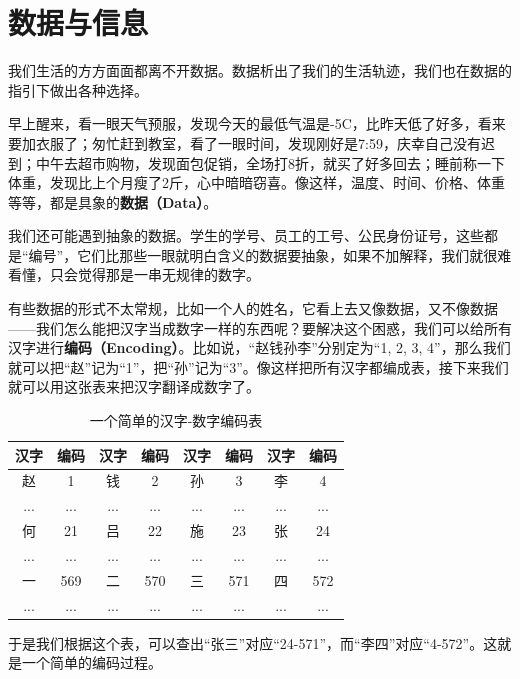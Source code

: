\section{数据与信息}
我们生活的方方面面都离不开数据。数据析出了我们的生活轨迹，我们也在数据的指引下做出各种选择。\par
早上醒来，看一眼天气预服，发现今天的最低气温是-5\textdegree C，比昨天低了好多，看来要加衣服了；匆忙赶到教室，看了一眼时间，发现刚好是7:59，庆幸自己没有迟到；中午去超市购物，发现面包促销，全场打8折，就买了好多回去；睡前称一下体重，发现比上个月瘦了2斤，心中暗暗窃喜。像这样，温度、时间、价格、体重等等，都是具象的\textbf{数据（Data）}。\par
我们还可能遇到抽象的数据。学生的学号、员工的工号、公民身份证号，这些都是“编号”，它们比那些一眼就明白含义的数据要抽象，如果不加解释，我们就很难看懂，只会觉得那是一串无规律的数字。\par
有些数据的形式不太常规，比如一个人的姓名，它看上去又像数据，又不像数据——我们怎么能把汉字当成数字一样的东西呢？要解决这个困惑，我们可以给所有汉字进行\textbf{编码（Encoding）}。比如说，``赵钱孙李''分别定为``1, 2, 3, 4''，那么我们就可以把``赵''记为``1''，把``孙''记为``3''。像这样把所有汉字都编成表，接下来我们就可以用这张表来把汉字翻译成数字了。\par
\begin{table}[htbp]
\centering
\begin{tabular}{cccccccc}
\hline
\rule{0pt}{2.4ex}
\textbf{汉字} & \textbf{编码} & \textbf{汉字} & \textbf{编码} & \textbf{汉字} & \textbf{编码} & \textbf{汉字} & \textbf{编码}\\
\hline\hline
\rule{0pt}{2.4ex}
赵 & 1 & 钱 & 2 & 孙 & 3 & 李 & 4 \\
\hline
\rule{0pt}{2.4ex}
... & ... & ... & ... & ... & ... & ... & ... \\
\hline
\rule{0pt}{2.4ex}
何 & 21 & 吕 & 22 & 施 & 23 & 张 & 24 \\
\hline
\rule{0pt}{2.4ex}
... & ... & ... & ... & ... & ... & ... & ... \\
\hline
\rule{0pt}{2.4ex}
一 & 569 & 二 & 570 & 三 & 571 & 四 & 572 \\
\hline
\rule{0pt}{2.4ex}
... & ... & ... & ... & ... & ... & ... & ... \\
\hline
\end{tabular}
\caption{一个简单的汉字-数字编码表}
\end{table}
于是我们根据这个表，可以查出``张三''对应``24-571''，而``李四''对应``4-572''。这就是一个简单的编码过程。\par
